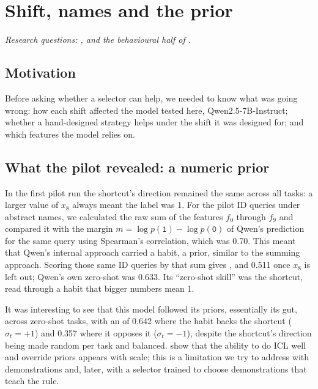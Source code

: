 \chapter{Shift, names and the prior}
\label{ch:shift}

\emph{Research questions: ,  and the behavioural half of .}

\section{Motivation}
Before asking whether a selector can help, we needed to know what was going wrong: how each shift affected the model tested here, Qwen2.5-7B-Instruct; whether a hand-designed strategy helps under the shift it was designed for; and which features the model relies on.

\section{What the pilot revealed: a numeric prior}
\label{sec:shift-p2}
In the first pilot run the shortcut's direction remained the same across all tasks: a larger value of $x_8$ always meant the label was 1. For the pilot ID queries under abstract names, we calculated the raw sum of the features $f_0$ through $f_9$ and compared it with the margin $m = \log p(\texttt{1}) - \log p(\texttt{0})$ of Qwen's prediction for the same query using Spearman's correlation, which was 0.70. This meant that Qwen's internal approach carried a habit, a prior, similar to the summing approach. Scoring those same ID queries by that sum gives , and 0.511 once $x_8$ is left out; Qwen's own zero-shot \AUROC was 0.633. Its ``zero-shot skill'' was the shortcut, read through a habit that bigger numbers mean 1.


\newpage
It was interesting to see that this model followed its priors, essentially its gut, across zero-shot tasks, with an \AUROC of 0.642 where the habit backs the shortcut ($\sigma_t = +1$) and 0.357 where it opposes it ($\sigma_t = -1$), despite the shortcut's direction being made random per task and balanced. \citet{wei2023larger} show that the ability to do ICL well and override priors appears with scale; this is a limitation we try to address with demonstrations and, later, with a selector trained to choose demonstrations that teach the rule.

